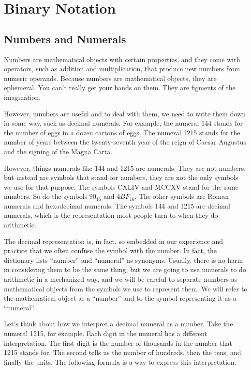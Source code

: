 \chapter{Binary Notation}

\section{Numbers and Numerals}
\label{sec:numbers-numerals}
Numbers are mathematical objects with certain properties,
and they come with operators, such as addition
and multiplication, that produce new numbers from numeric
operands.
Because numbers are mathematical objects, they are ephemeral.
You can't really get your hands on them.
They are figments of the imagination.

However, numbers are useful and to deal with them,
we need to write them down in some way, such as decimal numerals.
For example, the numeral 144 stands for the number
of eggs in a dozen cartons of eggs.
The numeral 1215 stands for the number of
years between the twenty-seventh year of the reign
of Caesar Augustus and the signing of the Magna Carta.

However, things numerals like 144 and 1215 are numerals.
They are not numbers, but instead are symbols that stand for numbers,
they are not the only symbols we use for that purpose.
The symbols CXLIV and MCCXV stand for the same numbers.
So do the symbols $90_{16}$ and $4BF_{16}$.
The other symbols are Roman numerals and hexadecimal numerals.
The symbols 144 and 1215 are decimal numerals,
which is the representation most
people turn to when they do arithmetic.

The decimal representation is, in fact, so embedded in
our experience and practice that we often confuse
the symbol with the number.
In fact, the dictionary lists ``number'' and ``numeral'' as synonyms.
Usually, there is no harm in considering them to be the same thing,
but we are going to use numerals
to do arithmetic in a mechanized way, and we will
be careful to separate numbers as mathematical
objects from the symbols we use to represent them.
We will refer to the mathematical object as a ``number''
and to the symbol representing it as a ``numeral''.

Let's think about how we interpret a decimal numeral as a number.
Take the numeral 1215, for example.
Each digit in the numeral has a different interpretation.
The first digit is the number of thousands in the number
that 1215 stands for. The second tells us the number
of hundreds, then the tens, and finally the units.
The following formula is a way to express this interpretation.

